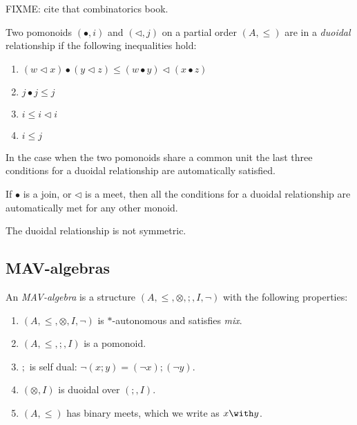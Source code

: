 FIXME: cite that combinatorics book.


\begin{definition}
  Two pomonoids $(\bullet, i)$ and $(\lhd, j)$ on a partial order
  $(A, \leq)$ are in a \emph{duoidal} relationship if the following
  inequalities hold:
  \begin{enumerate}
    \item $(w \lhd x) \bullet (y \lhd z) \leq (w \bullet y) \lhd (x \bullet z)$
    \item $j \bullet j \leq j$
    \item $i \leq i \lhd i$
    \item $i \leq j$
  \end{enumerate}
\end{definition}

\begin{remark}
  In the case when the two pomonoids share a common unit the last
  three conditions for a duoidal relationship are automatically
  satisfied.
\end{remark}

\begin{remark}
  If $\bullet$ is a join, or $\lhd$ is a meet, then all the conditions
  for a duoidal relationship are automatically met for any other
  monoid. 
\end{remark}

\begin{remark}
  The duoidal relationship is not symmetric.
\end{remark}

\subsection{MAV-algebras}

\begin{definition}\label{defn:mav-algebra}
  An \emph{MAV-algebra} is a structure
  $(A, \leq, \otimes, ;, I, \lnot)$ with the following properties:
  \begin{enumerate}
  \item $(A, \leq, \otimes, I, \lnot)$ is $*$-autonomous and satisfies \emph{mix}.
  \item $(A, \leq, ;, I)$ is a pomonoid.
  \item $;$ is self dual: $\lnot (x ; y) = (\lnot x); (\lnot y)$.
  \item $(\otimes, I)$ is duoidal over $(;, I)$.
  \item $(A, \leq)$ has binary meets, which we write as $x \with y$.
  \end{enumerate}
\end{definition}

